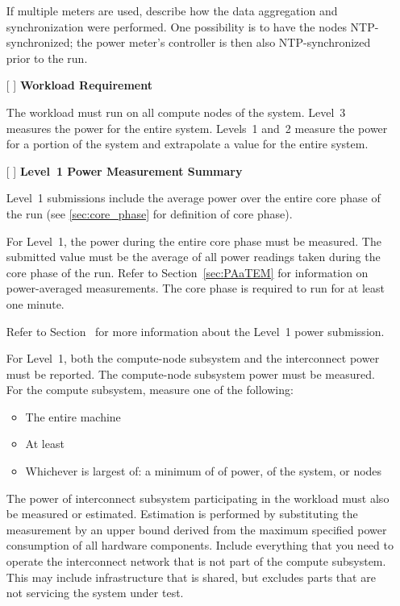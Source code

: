 \begin{itemize}
If multiple meters are used, describe how the data aggregation and synchronization were performed.
One possibility is to have the nodes NTP-synchronized; the power meter's controller is then also NTP-synchronized prior to the run.

\item[{[ ]}]
\textbf{Workload Requirement}

The workload must run on all compute nodes of the system.
Level~3 measures the power for the entire system.
Levels~1 and~2 measure the power for a portion of the system and extrapolate a value for the entire system.

\item[{[ ]}]
\textbf{Level~1 Power Measurement Summary}

Level~1 submissions include the average power over the entire core phase of the run (see \ref{sec:core_phase} for definition of core phase).

For Level~1, the power during the entire core phase must be measured.
The submitted value must be the average of all power readings taken during the core phase of the run.
Refer to Section~\ref{sec:PAaTEM} for information on power-averaged measurements.
The core phase is required to run for at least one minute.

Refer to Section~ for more information about the Level~1 power submission.

For Level~1, both the compute-node subsystem and the interconnect power must be reported.
The compute-node subsystem power must be measured.
For the compute subsystem, measure one of the following:
\begin{itemize}
\item The entire machine
\item At least \SpecPowerMaxLOne{}
\item Whichever is largest of: a minimum of \SpecPowerMinLOne{} of power, \SpecFracMinLOne{} of the system, or \SpecMinNodes{} nodes
\end{itemize}

The power of interconnect subsystem participating in the workload must also be measured or estimated.
Estimation is performed by substituting the measurement by an upper bound derived from the maximum specified power consumption of all hardware components.
Include everything that you need to operate the interconnect network that is not part of the compute subsystem.
This may include infrastructure that is shared, but excludes parts that are not servicing the system under test.


\end{itemize}
